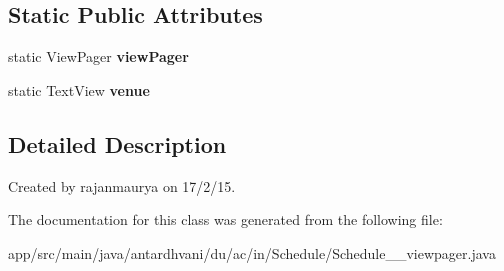 \subsection*{Static Public Attributes}
\begin{DoxyCompactItemize}
\item 
\hypertarget{classantardhvani_1_1du_1_1ac_1_1in_1_1_schedule_1_1_schedule__21__viewpager_a09e5b5e5e0c5e80262a5707ec54f23c7}{}static View\+Pager {\bfseries view\+Pager}\label{classantardhvani_1_1du_1_1ac_1_1in_1_1_schedule_1_1_schedule__21__viewpager_a09e5b5e5e0c5e80262a5707ec54f23c7}

\item 
\hypertarget{classantardhvani_1_1du_1_1ac_1_1in_1_1_schedule_1_1_schedule__21__viewpager_a0c0102ce7f122a2e181143d07ed93275}{}static Text\+View {\bfseries venue}\label{classantardhvani_1_1du_1_1ac_1_1in_1_1_schedule_1_1_schedule__21__viewpager_a0c0102ce7f122a2e181143d07ed93275}

\end{DoxyCompactItemize}


\subsection{Detailed Description}
Created by rajanmaurya on 17/2/15. 

The documentation for this class was generated from the following file\+:\begin{DoxyCompactItemize}
\item 
app/src/main/java/antardhvani/du/ac/in/\+Schedule/Schedule\+\_\+\_\+viewpager.\+java\end{DoxyCompactItemize}
